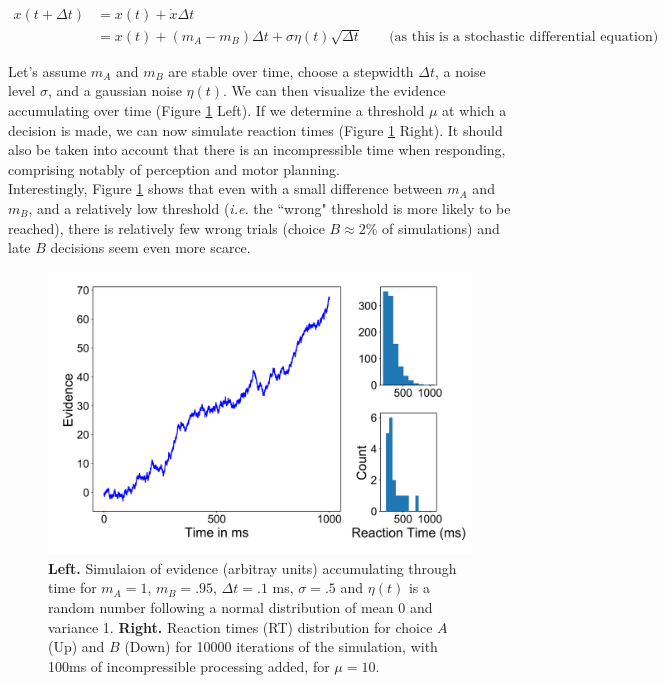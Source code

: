 \documentclass{article}
\begin{document}
\begin{align*}
x(t + \Delta t) &= x(t) + \dot{x}\Delta t \\
                &= x(t) + (m_A - m_B)\Delta t + \sigma \eta(t) \sqrt{\Delta t} \;\;\;\;\;\;\; \text{(as this is a stochastic differential equation)}
\end{align*}

Let's assume $m_A$ and $m_B$ are stable over time, choose a stepwidth $\Delta t$, a noise level $\sigma$, and a gaussian noise $\eta(t)$. We can then visualize the evidence accumulating over time (Figure \ref{fig:fig10} Left). If we determine a threshold $\mu$ at which a decision is made, we can now simulate reaction times (Figure \ref{fig:fig10} Right). It should also be taken into account that there is an incompressible time when responding, comprising notably of perception and motor planning. \\
\indent Interestingly, Figure \ref{fig:fig10} shows that even with a small difference between $m_A$ and $m_B$, and a relatively low threshold (\textit{i.e.} the ``wrong" threshold is more likely to be reached), there is relatively few wrong trials (choice $B \approx 2\%$ of simulations) and late $B$ decisions seem even more scarce.


\begin{figure}[H]
\centering
\includegraphics[width=.8\linewidth]{fig2_report13 (2).png}
\caption[growing population]{\textbf{Left.} Simulaion of evidence (arbitray units) accumulating through time for $m_A =1$, $m_B = .95$, $\Delta t = .1$ ms, $\sigma=.5$ and $\eta(t)$ is a random number following a normal distribution of mean 0 and variance 1. \textbf{Right.} Reaction times (RT) distribution for choice $A$ (Up) and $B$ (Down) for 10000 iterations of the simulation, with 100ms of incompressible processing added, for $\mu=10$.}\label{fig:fig10}
\end{figure}
\end{document}
